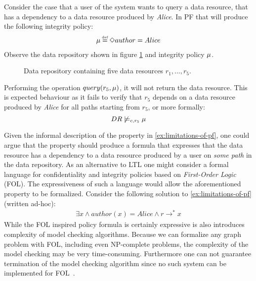 \begin{example}\label{ex:limitations-of-pf}
Consider the case that a user of the system wants to query a data resource, that has a dependency to a data resource produced by \emph{Alice}. In PF that will produce the following integrity policy:
\begin{align*}
    \inte \eqdef \F author = Alice
\end{align*}
Observe the data repository shown in figure \ref{fig:pf-limitations} and integrity policy $\mu$.
\begin{figure}[!ht]
    \centering
    
    \caption{Data repository containing five data resources $r_1,\ldots,r_5$.}
    \label{fig:pf-limitations}
\end{figure}
Performing the operation $query(r_5, \mu)$, it will not return the data resource. This is expected behaviour as it fails to verify that $r_5$ depends on a data resource produced by \emph{Alice} for all paths starting from $r_5$, or more formally:
\begin{equation*}
    DR \not\models_{c,r_5} \mu
\end{equation*}
\end{example}
Given the informal description of the property in \autoref{ex:limitations-of-pf}, one could argue that the property should produce a formula that expresses that the data resource has a dependency to a data resource produced by a user on \emph{some path} in the data repository. As an alternative to LTL one might consider a formal language for confidentiality and integrity policies based on \emph{First-Order Logic} (FOL). The expressiveness of such a language would allow the aforementioned property to be formalized. Consider the following solution to \autoref{ex:limitations-of-pf} (written ad-hoc):
\begin{align*}
    \exists x \land author(x) = Alice \land r \longrightarrow^\ast x
\end{align*}
While the FOL inspired policy formula is certainly expressive is also introduces complexity of model checking algorithms. Because we can formalize any graph problem with FOL, including even NP-complete problems, the complexity of the model checking may be very time-consuming. Furthermore one can not guarantee termination of the model checking algorithm since no such system can be implemented for FOL~\cite{church1936note}.

